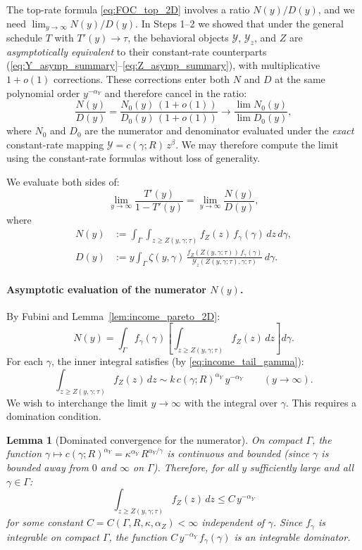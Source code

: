 \documentclass[12pt,a4paper]{article}
\theoremstyle{definition}
\theoremstyle{plain}
\newtheorem{lemma}{Lemma}[section]
\theoremstyle{remark}
\newcommand{\calY}{\mathcal{Y}}
\begin{document}
The top-rate formula \eqref{eq:FOC_top_2D} involves a ratio $N(y)/D(y)$, and we need $\lim_{y \to \infty} N(y)/D(y)$.  In Steps 1--2 we showed that under the general schedule $T$ with $T'(y) \to \tau$, the behavioral objects $\calY$, $\calY_z$, and $Z$ are \emph{asymptotically equivalent} to their constant-rate counterparts (\eqref{eq:Y_asymp_summary}--\eqref{eq:Z_asymp_summary}), with multiplicative $1 + o(1)$ corrections.  These corrections enter both $N$ and $D$ at the same polynomial order $y^{-\alpha_Y}$ and therefore cancel in the ratio:
\[
  \frac{N(y)}{D(y)} = \frac{N_0(y)\,(1+o(1))}{D_0(y)\,(1+o(1))} \to \frac{\lim N_0(y)}{\lim D_0(y)},
\]
where $N_0$ and $D_0$ are the numerator and denominator evaluated under the \emph{exact} constant-rate mapping $\calY = c(\gamma;R)\,z^{\beta}$.  We may therefore compute the limit using the constant-rate formulas without loss of generality.

We evaluate both sides of:
\begin{equation}
\label{eq:FOC_top_2D_repeat}
  \lim_{y \to \infty}\frac{T'(y)}{1-T'(y)} = \lim_{y \to \infty}\frac{N(y)}{D(y)},
\end{equation}
where
\begin{align}
  N(y) &:= \int_{\Gamma}\int_{z \geq Z(y,\gamma;\tau)} f_Z(z)\,f_{\gamma}(\gamma)\,dz\,d\gamma, \label{eq:N_def_2D} \\
  D(y) &:= y\int_{\Gamma} \zeta(y,\gamma)\,\frac{f_Z(Z(y,\gamma;\tau))\,f_{\gamma}(\gamma)}{\calY_z(Z(y,\gamma;\tau),\gamma;\tau)}\,d\gamma. \label{eq:D_def_2D}
\end{align}

\paragraph{Asymptotic evaluation of the numerator $N(y)$.}

By Fubini and Lemma~\ref{lem:income_pareto_2D}:
\begin{equation}
\label{eq:N_asymp_step1}
  N(y) = \int_{\Gamma} f_{\gamma}(\gamma)\left[\int_{z \geq Z(y,\gamma;\tau)} f_Z(z)\,dz\right] d\gamma.
\end{equation}
For each $\gamma$, the inner integral satisfies (by \eqref{eq:income_tail_gamma}):
\[
  \int_{z \geq Z(y,\gamma;\tau)} f_Z(z)\,dz \sim k\,c(\gamma;R)^{\alpha_Y}\,y^{-\alpha_Y} \qquad (y \to \infty).
\]
We wish to interchange the limit $y \to \infty$ with the integral over $\gamma$.  This requires a domination condition.

\begin{lemma}[Dominated convergence for the numerator]
\label{lem:DCT_numerator_2D}
On compact $\Gamma$, the function $\gamma \mapsto c(\gamma;R)^{\alpha_Y} = \kappa^{\alpha_Y}\,R^{\alpha_Y/\gamma}$ is continuous and bounded (since $\gamma$ is bounded away from $0$ and $\infty$ on $\Gamma$).  Therefore, for all $y$ sufficiently large and all $\gamma \in \Gamma$:
\[
  \int_{z \geq Z(y,\gamma;\tau)} f_Z(z)\,dz \leq C\,y^{-\alpha_Y}
\]
for some constant $C = C(\Gamma,R,\kappa,\alpha_Z) < \infty$ independent of $\gamma$.  Since $f_{\gamma}$ is integrable on compact $\Gamma$, the function $C\,y^{-\alpha_Y}\,f_{\gamma}(\gamma)$ is an integrable dominator.
\end{lemma}
\end{document}
